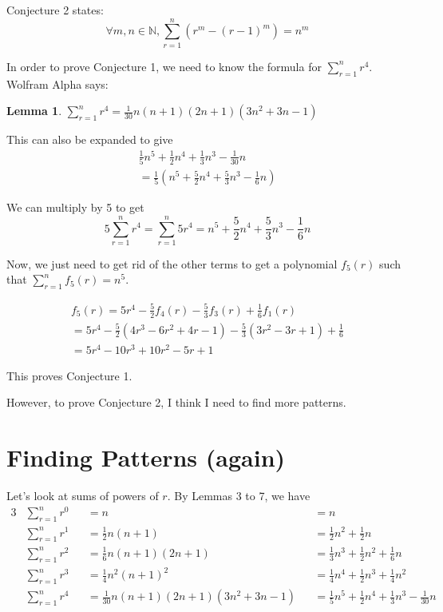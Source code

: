 \documentclass[a4paper]{article}
\newcommand{\sn}{\sum\limits_{r=1}^{n}}
\newcommand{\inn}{\in \mathbb{N}}
\newcommand{\oo}[1]{\frac{1}{#1}}
\newtheorem{lemma}{Lemma}
\begin{document}
Conjecture 2 states: $$\forall m, n \inn, \sn \left(r^m - (r - 1)^m\right) = n^m$$

In order to prove Conjecture 1, we need to know the formula for $\sn r^4$. Wolfram Alpha says:

\begin{lemma}
$\sn r^4 = \oo{30}n(n + 1)(2n + 1)\left(3n^2 + 3n - 1\right)$
\end{lemma}

This can also be expanded to give
\begin{gather*}
\oo{5}n^5 + \oo{2}n^4 + \oo{3}n^3 - \oo{30}n\\[0.2em]
= \oo{5}\left(n^5 + \frac{5}{2}n^4 + \frac{5}{3}n^3 - \oo{6}n\right)
\end{gather*}

We can multiply by 5 to get $$5 \sn r^4 = \sn 5r^4 = n^5 + \frac{5}{2}n^4 + \frac{5}{3}n^3 - \oo{6}n$$

Now, we just need to get rid of the other terms to get a polynomial $f_5(r)$ such that $\sn f_5(r) = n^5$.

\begin{gather*}
f_5(r) = 5r^4 - \frac{5}{2}f_4(r) - \frac{5}{3}f_3(r) + \oo{6}f_1(r)\\
= 5r^4 - \frac{5}{2}\left(4r^3 - 6r^2 + 4r - 1\right) - \frac{5}{3}\left(3r^2 - 3r + 1\right) + \oo{6}\\
= 5r^4 - 10r^3 + 10r^2 - 5r + 1
\end{gather*}

This proves Conjecture 1.

However, to prove Conjecture 2, I think I need to find more patterns.

\section{Finding Patterns (again)}

Let's look at sums of powers of $r$. By Lemmas 3 to 7, we have
\begin{alignat*}{3}
&\sn r^0 &&= n &&= n\\
&\sn r^1 &&= \oo{2}n(n + 1) &&= \oo{2}n^2 + \oo{2}n\\
&\sn r^2 &&= \oo{6}n(n + 1)(2n + 1) &&= \oo{3}n^3 + \oo{2}n^2 + \oo{6}n\\
&\sn r^3 &&= \oo{4}n^2(n + 1)^2 &&= \oo{4}n^4 + \oo{2}n^3 + \oo{4}n^2\\
&\sn r^4 &&= \oo{30}n(n + 1)(2n + 1)\left(3n^2 + 3n - 1\right) &&= \oo{5}n^5 + \oo{2}n^4 + \oo{3}n^3 - \oo{30}n
\end{alignat*}
\end{document}
